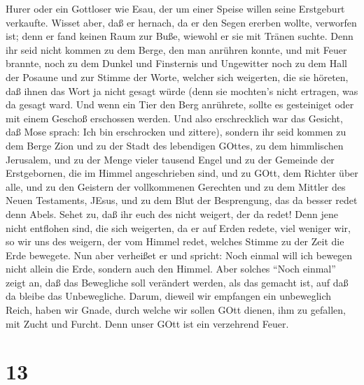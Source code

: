 Hurer oder ein Gottloser wie Esau, der um einer Speise willen seine
Erstgeburt verkaufte.  Wisset aber, daß er hernach, da er
den Segen ererben wollte, verworfen ist; denn er fand keinen Raum zur
Buße, wiewohl er sie mit Tränen suchte.  Denn ihr seid
nicht kommen zu dem Berge, den man anrühren konnte, und mit Feuer
brannte, noch zu dem Dunkel und Finsternis und Ungewitter 
noch zu dem Hall der Posaune und zur Stimme der Worte, welcher sich
weigerten, die sie höreten, daß ihnen das Wort ja nicht gesagt würde
 (denn sie mochten's nicht ertragen, was da gesagt ward.
Und wenn ein Tier den Berg anrührete, sollte es gesteiniget oder mit
einem Geschoß erschossen werden.  Und also erschrecklich
war das Gesicht, daß Mose sprach: Ich bin erschrocken und zittere),
 sondern ihr seid kommen zu dem Berge Zion und zu der Stadt
des lebendigen GOttes, zu dem himmlischen Jerusalem, und zu der Menge
vieler tausend Engel  und zu der Gemeinde der Erstgebornen,
die im Himmel angeschrieben sind, und zu GOtt, dem Richter über alle,
und zu den Geistern der vollkommenen Gerechten  und zu dem
Mittler des Neuen Testaments, JEsus, und zu dem Blut der Besprengung,
das da besser redet denn Abels.  Sehet zu, daß ihr euch des
nicht weigert, der da redet! Denn jene nicht entflohen sind, die sich
weigerten, da er auf Erden redete, viel weniger wir, so wir uns des
weigern, der vom Himmel redet,  welches Stimme zu der Zeit
die Erde bewegete. Nun aber verheißet er und spricht: Noch einmal will
ich bewegen nicht allein die Erde, sondern auch den Himmel.
 Aber solches ``Noch einmal'' zeigt an, daß das Bewegliche
soll verändert werden, als das gemacht ist, auf daß da bleibe das
Unbewegliche.  Darum, dieweil wir empfangen ein unbeweglich
Reich, haben wir Gnade, durch welche wir sollen GOtt dienen, ihm zu
gefallen, mit Zucht und Furcht.  Denn unser GOtt ist ein
verzehrend Feuer.

\hypertarget{section-11}{%
\section{13}\label{section-11}}

